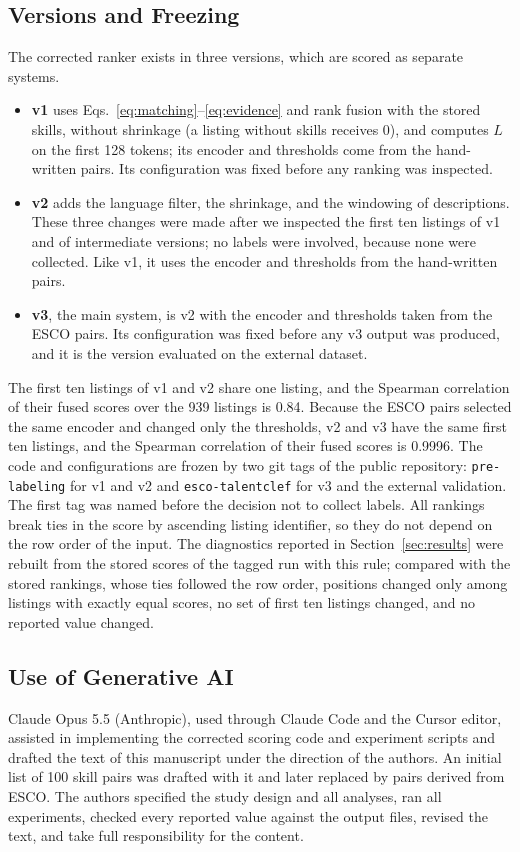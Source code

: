 \documentclass[CHICAGO]{USG}
\begin{document}
\subsection{Versions and Freezing}
\label{sec:versions}
The corrected ranker exists in three versions, which are scored as separate systems.
\begin{itemize}
\item \textbf{v1} uses Eqs.~\eqref{eq:matching}--\eqref{eq:evidence} and rank fusion with the stored skills, without shrinkage (a listing without skills receives 0), and computes $L$ on the first 128 tokens; its encoder and thresholds come from the hand-written pairs. Its configuration was fixed before any ranking was inspected. %
\item \textbf{v2} adds the language filter, the shrinkage, and the windowing of descriptions. These three changes were made after we inspected the first ten listings of v1 and of intermediate versions; no labels were involved, because none were collected. Like v1, it uses the encoder and thresholds from the hand-written pairs. %
\item \textbf{v3}, the main system, is v2 with the encoder and thresholds taken from the ESCO pairs. Its configuration was fixed before any v3 output was produced, and it is the version evaluated on the external dataset. %
\end{itemize}
The first ten listings of v1 and v2 share one listing, and the Spearman correlation of their fused scores over the 939 listings is 0.84. %
Because the ESCO pairs selected the same encoder and changed only the thresholds, v2 and v3 have the same first ten listings, and the Spearman correlation of their fused scores is 0.9996. %
The code and configurations are frozen by two git tags of the public repository: \texttt{pre-labeling} for v1 and v2 and \texttt{esco-talentclef} for v3 and the external validation. The first tag was named before the decision not to collect labels. All rankings break ties in the score by ascending listing identifier, so they do not depend on the row order of the input. The diagnostics reported in Section~\ref{sec:results} were rebuilt from the stored scores of the tagged run with this rule; compared with the stored rankings, whose ties followed the row order, positions changed only among listings with exactly equal scores, no set of first ten listings changed, and no reported value changed. %

\subsection{Use of Generative AI}
\label{sec:ai}
Claude Opus 5.5 (Anthropic), used through Claude Code and the Cursor editor, assisted in implementing the corrected scoring code and experiment scripts and drafted the text of this manuscript under the direction of the authors. An initial list of 100 skill pairs was drafted with it and later replaced by pairs derived from ESCO. The authors specified the study design and all analyses, ran all experiments, checked every reported value against the output files, revised the text, and take full responsibility for the content.
\end{document}
